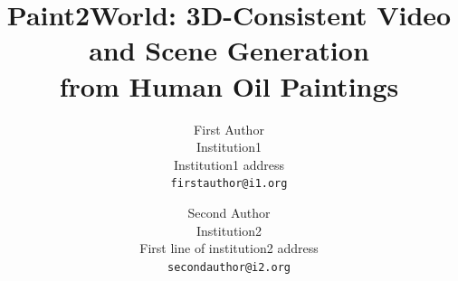 \documentclass[10pt,twocolumn,letterpaper]{article}
\title{Paint2World: 3D-Consistent Video and Scene Generation\\from Human Oil Paintings}
\author{First Author\\
Institution1\\
Institution1 address\\
{\tt\small firstauthor@i1.org}
\and
Second Author\\
Institution2\\
First line of institution2 address\\
{\tt\small secondauthor@i2.org}
}
\begin{document}
\maketitle








{
    \small
    
    
}

% 
\end{document}
